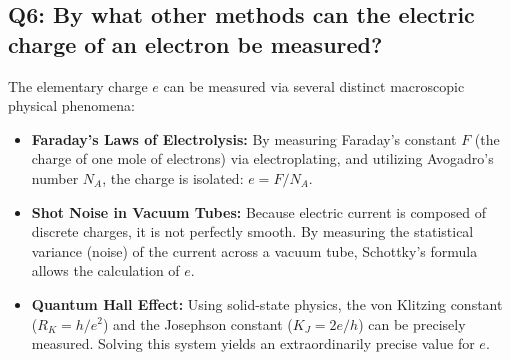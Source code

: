 \documentclass[a4paper,11pt]{article}
\begin{document}
\subsection*{Q6: By what other methods can the electric charge of an electron be measured?}
The elementary charge $e$ can be measured via several distinct macroscopic physical phenomena:
\begin{itemize}
    \item \textbf{Faraday's Laws of Electrolysis:} By measuring Faraday's constant $F$ (the charge of one mole of electrons) via electroplating, and utilizing Avogadro's number $N_A$, the charge is isolated: $e = F / N_A$.
    \item \textbf{Shot Noise in Vacuum Tubes:} Because electric current is composed of discrete charges, it is not perfectly smooth. By measuring the statistical variance (noise) of the current across a vacuum tube, Schottky's formula allows the calculation of $e$.
    \item \textbf{Quantum Hall Effect:} Using solid-state physics, the von Klitzing constant ($R_K = h/e^2$) and the Josephson constant ($K_J = 2e/h$) can be precisely measured. Solving this system yields an extraordinarily precise value for $e$.
\end{itemize}
\end{document}
